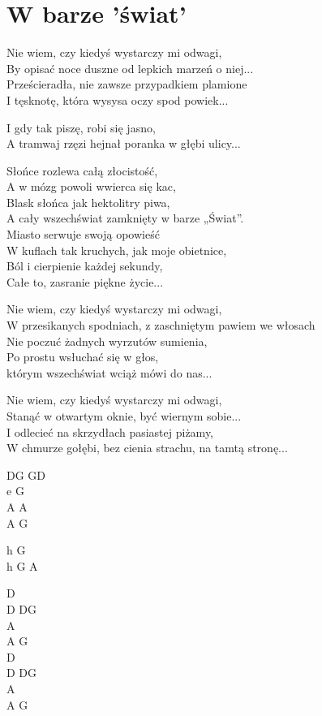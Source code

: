 \section{W barze 'świat'}
\begin{text}
Nie wiem, czy kiedyś wystarczy mi odwagi,\\
By opisać noce duszne od lepkich marzeń o niej...\\
Prześcieradła, nie zawsze przypadkiem plamione\\
I tęsknotę, która wysysa oczy spod powiek...

\vin I gdy tak piszę, robi się jasno,\\
\vin A tramwaj rzęzi hejnał poranka w głębi ulicy...

\vin Słońce rozlewa całą złocistość,\\
\vin A w mózg powoli wwierca się kac,\\
\vin Blask słońca jak hektolitry piwa,\\
\vin A cały wszechświat zamknięty w barze „Świat”.\\
\vin Miasto serwuje swoją opowieść\\
\vin W kuflach tak kruchych, jak moje obietnice,\\
\vin Ból i cierpienie każdej sekundy,\\
\vin Całe to, zasranie piękne życie...

Nie wiem, czy kiedyś wystarczy mi odwagi,\\
W przesikanych spodniach, z zaschniętym pawiem we włosach\\
Nie poczuć żadnych wyrzutów sumienia,\\
Po prostu wsłuchać się w głos,\\
którym wszechświat wciąż mówi do nas...

Nie wiem, czy kiedyś wystarczy mi odwagi,\\
Stanąć w otwartym oknie, być wiernym sobie...\\
I odlecieć na skrzydłach pasiastej piżamy,\\
W chmurze gołębi, bez cienia strachu, na tamtą stronę...
\end{text}
\begin{chord}
    DG GD\\
    e G\\
    A A\\
    A G

    h G\\
    h G A

    D\\
    D DG\\
    A\\
    A G\\
    D\\
    D DG\\
    A\\
    A G
\end{chord}